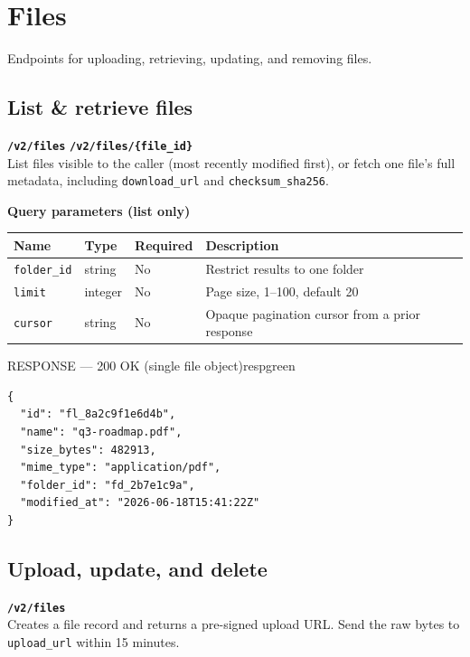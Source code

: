 \section{Files}
Endpoints for uploading, retrieving, updating, and removing files.

\subsection{List \& retrieve files}
\begin{routebox}
\hspace{6pt}\texttt{\textbf{/v2/files}}\hspace{10pt}
\hspace{6pt}\texttt{\textbf{/v2/files/\{file\_id\}}}\\[3pt]
{\small List files visible to the caller (most recently modified first), or fetch one
file's full metadata, including \texttt{download\_url} and \texttt{checksum\_sha256}.}
\end{routebox}

{\small\textbf{Query parameters (list only)}}
\begin{center}
\begin{tabularx}{\linewidth}{@{}p{2.3cm}p{1.3cm}p{1.7cm}X@{}}
\toprule
\rowcolor{panelgray}
\textbf{Name} & \textbf{Type} & \textbf{Required} & \textbf{Description} \\
\midrule
\texttt{folder\_id} & string & No & Restrict results to one folder \\
\texttt{limit} & integer & No & Page size, 1--100, default 20 \\
\texttt{cursor} & string & No & Opaque pagination cursor from a prior response \\
\bottomrule
\end{tabularx}
\end{center}

\begin{jsonpanel}{RESPONSE — 200 OK (single file object)}{respgreen}
\begin{lstlisting}
{
  "id": "fl_8a2c9f1e6d4b",
  "name": "q3-roadmap.pdf",
  "size_bytes": 482913,
  "mime_type": "application/pdf",
  "folder_id": "fd_2b7e1c9a",
  "modified_at": "2026-06-18T15:41:22Z"
}
\end{lstlisting}
\end{jsonpanel}

\subsection{Upload, update, and delete}
\begin{routebox}
\hspace{6pt}\texttt{\textbf{/v2/files}}\\[3pt]
{\small Creates a file record and returns a pre-signed upload URL. Send the raw bytes to
\texttt{upload\_url} within 15 minutes.}
\end{routebox}


